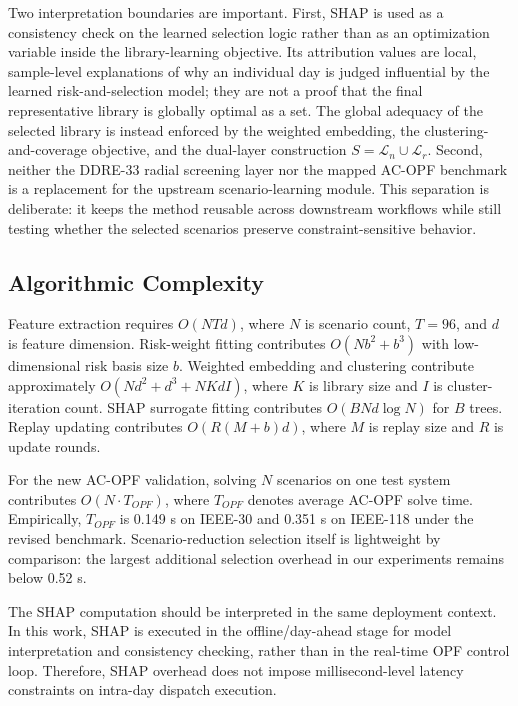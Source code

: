 \documentclass[journal]{IEEEtran}
\begin{document}
Two interpretation boundaries are important. First, SHAP is used as a consistency check on the learned selection logic rather than as an optimization variable inside the library-learning objective. Its attribution values are local, sample-level explanations of why an individual day is judged influential by the learned risk-and-selection model; they are not a proof that the final representative library is globally optimal as a set. The global adequacy of the selected library is instead enforced by the weighted embedding, the clustering-and-coverage objective, and the dual-layer construction $S=\mathcal{L}_n\cup\mathcal{L}_r$. Second, neither the DDRE-33 radial screening layer nor the mapped AC-OPF benchmark is a replacement for the upstream scenario-learning module. This separation is deliberate: it keeps the method reusable across downstream workflows while still testing whether the selected scenarios preserve constraint-sensitive behavior.

\subsection{Algorithmic Complexity}
Feature extraction requires $O(NTd)$, where $N$ is scenario count, $T=96$, and $d$ is feature dimension. Risk-weight fitting contributes $O(Nb^2+b^3)$ with low-dimensional risk basis size $b$. Weighted embedding and clustering contribute approximately $O(Nd^2+d^3+NKdI)$, where $K$ is library size and $I$ is cluster-iteration count. SHAP surrogate fitting contributes $O(BNd\log N)$ for $B$ trees. Replay updating contributes $O(R(M+b)d)$, where $M$ is replay size and $R$ is update rounds.

For the new AC-OPF validation, solving $N$ scenarios on one test system contributes $O(N \cdot T_{OPF})$, where $T_{OPF}$ denotes average AC-OPF solve time. Empirically, $T_{OPF}$ is 0.149 s on IEEE-30 and 0.351 s on IEEE-118 under the revised benchmark. Scenario-reduction selection itself is lightweight by comparison: the largest additional selection overhead in our experiments remains below 0.52 s.

The SHAP computation should be interpreted in the same deployment context. In this work, SHAP is executed in the offline/day-ahead stage for model interpretation and consistency checking, rather than in the real-time OPF control loop. Therefore, SHAP overhead does not impose millisecond-level latency constraints on intra-day dispatch execution.
\end{document}

